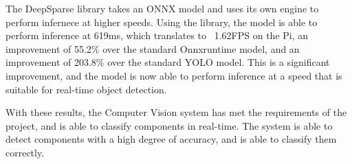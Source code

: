 The DeepSparse library \cite{deepsparse} takes an ONNX model and uses its own engine to perform infernece at higher speeds. Using the library, the model is able to perform inference at 619ms, which translates to ~1.62FPS on the Pi, an improvement of 55.2\% over the standard Onnxruntime model, and an improvement of 203.8\% over the standard YOLO model. This is a significant improvement, and the model is now able to perform inference at a speed that is suitable for real-time object detection.

With these results, the Computer Vision system has met the requirements of the project, and is able to classify components in real-time. The system is able to detect components with a high degree of accuracy, and is able to classify them correctly.